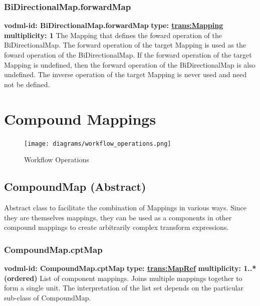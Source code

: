     \subsubsection{BiDirectionalMap.forwardMap}
      \textbf{vodml-id: BiDirectionalMap.forwardMap} \newline
      \textbf{type: \hyperref[sect:Mapping]{trans:Mapping}} \newline
      \textbf{multiplicity: 1} \newline 
      The Mapping that defines the foward operation of the BiDirectionalMap. The forward operation of the target Mapping is used as the foward operation of the BiDirectionalMap. If the forward operation of the target Mapping is undefined, then the forward operation of the BiDirectionalMap is also undefined. The inverse operation of the target Mapping is never used and need not be defined.


\pagebreak
\section{Compound Mappings}

  \begin{figure}[h]
  \begin{center}
    \texttt{[image: diagrams/workflow\_operations.png]}
    \caption{Workflow Operations}\label{fig:WorkOps}
  \end{center}
  \end{figure}

  \subsection{CompoundMap (Abstract)}
  \label{sect:CompoundMap}
    Abstract class to facilitate the combination of Mappings in various ways. Since they are themselves mappings, they can be used as a components in other compound mappings to create arbitrarily complex transform expressions.

    \subsubsection{CompoundMap.cptMap}
      \textbf{vodml-id: CompoundMap.cptMap} \newline
      \textbf{type: \hyperref[sect:MapRef]{trans:MapRef}} \newline
      \textbf{multiplicity: 1..*  (ordered)} \newline 
      List of component mappings. Joins multiple mappings together to form a single unit. The interpretation of the list set depends on the particular sub-class of CompoundMap.

